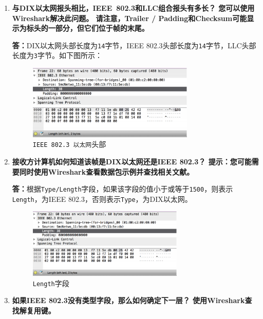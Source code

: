 \documentclass{article}
\begin{document}
\begin{enumerate}[noitemsep]
  \item \textbf{与DIX以太网报头相比，IEEE 802.3和LLC组合报头有多长？
  您可以使用Wireshark解决此问题。 请注意，Trailer / Padding和Checksum可能显示为标头的一部分，但它们位于帧的末尾。}
  

        \textbf{答：}DIX以太网头部长度为\texttt{14}字节，IEEE 802.3头部长度为\texttt{14}字节，LLC头部长度为\texttt{3}字节。如下图所示：

        \begin{figure}[H]
          \centering
          \includegraphics[width=0.75\textwidth]{images/18.png}
          \caption{\texttt{IEEE 802.3 以太网}头部}
        \end{figure}

  \item \textbf{接收方计算机如何知道该帧是DIX以太网还是IEEE 802.3？ 提示：您可能需要同时使用Wireshark查看数据包示例并查找相关文献。}

        \textbf{答：}根据\texttt{Type/Length}字段，如果该字段的值小于或等于\texttt{1500}，则表示\texttt{Length}，为IEEE 802.3，否则表示\texttt{Type}，为DIX以太网。

        \begin{figure}[H]
          \centering
          \includegraphics[width=0.7\textwidth]{images/18.png}
          \caption{\texttt{Length}字段}
        \end{figure}

  \item \textbf{如果IEEE 802.3没有类型字段，那么如何确定下一层？ 使用Wireshark查找解复用键。}


\end{enumerate}
\end{document}
